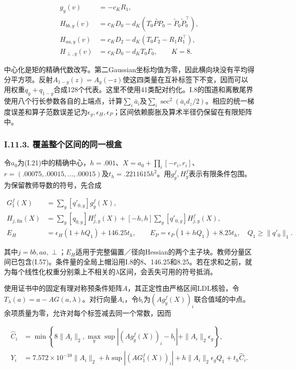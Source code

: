 \documentclass[11pt,a4paper]{article}
\begin{document}
\[
\begin{aligned}
g_y(v)&=-c_KR_1,\\
H_{bb,y}(v)&=c_KD_0-d_K(T_0\widetilde{PP}_0-\widetilde P_0\widetilde P_0^\top),\\
H_{aa,y}(v)&=c_KD_2-d_K(T_0\Gamma_2-R_1R_1^\top),\\
H_{\perp,y}(v)&=c_KD_0-d_KT_0\Gamma_0,\qquad K=8.
\end{aligned}
\tag{I.59}
\]

中心化是矩的精确代数改写。第二Gaussian坐标均值为零，因此横向块没有平均得分平方项。反射\(A_{1-y}(z)=A_y(-z)\)使这四类量在互补标签下不变，因而可以用权重\(q_y+q_{1-y}\)合成128个代表。这里不使用41类配对约化。I.8的围道和离散尾界使用八个行长参数各自的上端点，计算\(\sum_i\bar a_i\)及\(\sum_i\sec^2(\bar a_i d_z/2)\)。相应的统一梯度误差和算子范数误差记为\(\epsilon_g,\epsilon_H,\epsilon_P\)；区间依赖膨胀及算术半径仍保留在有限矩阵中。

\subsubsection*{I.11.3.
覆盖整个区间的同一根盒}\label{i.11.3.-ux8986ux76d6ux6574ux4e2aux533aux95f4ux7684ux540cux4e00ux6839ux76d2}

令\(a_0\)为(I.21)中的精确中心，\(h=.001\)、\(X=a_0+\prod_i[-r_i,r_i]\)、\(r=(.00075,.00015,\ldots,.00015)\)及\(t_h=.2211615h^2\)。用\(g_y^f,H_y^f\)表示有限条件包围。为保留教师导数的符号，先合成

\[
\begin{aligned}
G_1^f(X)&=\sum_y[q'_{0,y}]g_y^f(X),\\
H_{j,\mathrm{fin}}(X)&=\sum_y[q_{0,y}]H_{j,y}^f(X)
+[-h,h]\sum_y[q'_{0,y}]H_{j,y}^f(X),\\
E_H&=\epsilon_H(1+hQ_1)+146.25t_h,\qquad
E_P=\epsilon_P(1+hQ_1)+8.25t_h,\quad Q_1\ge\|q'_0\|_1.
\end{aligned}
\tag{I.60}
\]

其中\(j=bb,aa,\perp\)；\(E_H\)适用于完整偏置／径向Hessian的两个主子块。教师分量区间已包含(I.57)。条件量的全局上帽沿用I.8的8、146.25和8.25。若在求和之前，就为每个线性化权重分别乘上不相关的\(\lambda\)区间，会丢失可用的符号抵消。

使用证书中的固定有理对称预条件矩阵\(A\)，其正定性由严格区间LDL核验，令\(T_\lambda(a)=a-AG(a,\lambda)\)。对行向量\(A_i\)，令\(b_i\)为\((Ag_y^f(X))_i\)联合值域的中点。余项质量为零，允许对每个标签减去同一个常数，因而

\[
\begin{aligned}
\widehat C_i&=\min\left\{8\|A_i\|_2,
\max_y\sup|(Ag_y^f(X))_i-b_i|+\|A_i\|_2\epsilon_g\right\},\\
Y_i&=7.572\times10^{-10}\|A_i\|_2
+h\sup|(AG_1^f(X))_i|
+h\|A_i\|_2\epsilon_gQ_1+t_h\widehat C_i.
\end{aligned}
\tag{I.61}
\]
\end{document}
